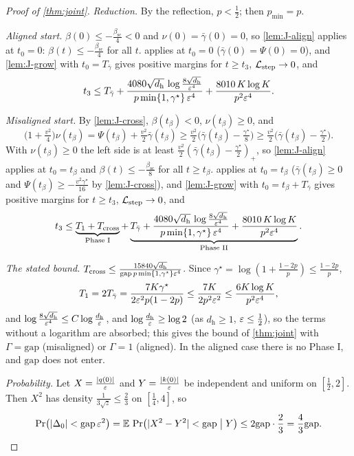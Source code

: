 \begin{proof}[Proof of \cref{thm:joint}]
\emph{Reduction.} By the reflection, $p<\frac{1}{2}$; then $p_{\min}=p$.

\emph{Aligned start.} $\beta(0)\le-\frac{\beta_{\mathrm{sc}}}{4}<0$ and $\nu(0)=\bar\gamma(0)=0$, so \cref{lem:J-align} applies at $t_0=0$: $\beta(t)\le-\frac{\beta_{\mathrm{sc}}}{4}$ for all $t$.
 applies at $t_0=0$ ($\bar\gamma(0)=\Psi(0)=0$), and
\cref{lem:J-grow} with $t_0=T_{\bar\gamma}$ gives positive margins for $t\ge t_3$, $\mathcal L_{\mathrm{step}}\to0$, and
\[
 t_3\le T_{\bar\gamma}+\frac{4080\sqrt{d_{\mathrm h}}\,\log\frac{8\sqrt{d_{\mathrm h}}}{\varepsilon^4}}{p\min\{1,\gamma^\star\}\,\varepsilon^4}+\frac{8010\,K\log K}{p^2\varepsilon^4} .
\]

\emph{Misaligned start.} By \cref{lem:J-cross}, $\beta(t_\beta)<0$, $\nu(t_\beta)\ge0$, and
\[
 \bigl(1+\tfrac{v^2}{4}\bigr)\nu(t_\beta)=\Psi(t_\beta)+\tfrac{v^2}{2}\bar\gamma(t_\beta)\ge\tfrac{v^2}{2}\bigl(\bar\gamma(t_\beta)-\tfrac{\gamma^\star}{8}\bigr)\ge\tfrac{v^2}{2}\bigl(\bar\gamma(t_\beta)-\tfrac{\gamma^\star}{2}\bigr).
\]
With $\nu(t_\beta)\ge0$ the left side is at least $\frac{v^2}{2}(\bar\gamma(t_\beta)-\frac{\gamma^\star}{2})_+$, so \cref{lem:J-align} applies at $t_0=t_\beta$ and $\beta(t)\le-\frac{\beta_{\mathrm{sc}}}{8}$ for all $t\ge t_\beta$. 
applies at $t_0=t_\beta$ ($\bar\gamma(t_\beta)\ge0$ and $\Psi(t_\beta)\ge-\frac{v^2\gamma^\star}{16}$ by \cref{lem:J-cross}), and \cref{lem:J-grow} with $t_0=t_\beta+T_{\bar\gamma}$ gives positive margins for $t\ge t_3$, $\mathcal L_{\mathrm{step}}\to0$, and
\[
 t_3\le\underbrace{T_1+T_{\mathrm{cross}}}_{\text{Phase I}}+\underbrace{T_{\bar\gamma}+\frac{4080\sqrt{d_{\mathrm h}}\,\log\frac{8\sqrt{d_{\mathrm h}}}{\varepsilon^4}}{p\min\{1,\gamma^\star\}\,\varepsilon^4}+\frac{8010\,K\log K}{p^2\varepsilon^4}}_{\text{Phase II}} .
\]

\emph{The stated bound.} $T_{\mathrm{cross}}\le\frac{15840\sqrt{d_{\mathrm h}}}{\mathrm{gap}\,p\min\{1,\gamma^\star\}\varepsilon^4}$. Since $\gamma^\star=\log(1+\frac{1-2p}{p})\le\frac{1-2p}{p}$,
\[
 T_1=2T_{\bar\gamma}=\frac{7K\gamma^\star}{2\varepsilon^2p(1-2p)}\le\frac{7K}{2p^2\varepsilon^2}\le\frac{6K\log K}{p^2\varepsilon^4},
\]
and $\log\frac{8\sqrt{d_{\mathrm h}}}{\varepsilon^4}\le C\log\frac{d_{\mathrm h}}{\varepsilon}$, and $\log\frac{d_{\mathrm h}}{\varepsilon}\ge\log2$ (as $d_{\mathrm h}\ge1$, $\varepsilon\le\frac12$), so the terms without a logarithm are absorbed; this gives the bound of \cref{thm:joint} with $\Gamma=\mathrm{gap}$ (misaligned) or $\Gamma=1$ (aligned). In the
aligned case there is no Phase I, and $\mathrm{gap}$ does not enter.

\emph{Probability.} Let $X=\frac{|q(0)|}{\varepsilon}$ and $Y=\frac{|k(0)|}{\varepsilon}$ be independent and uniform on $[\frac{1}{2},2]$. Then $X^2$ has density
$\frac{1}{3\sqrt z}\le\frac{2}{3}$ on $[\frac{1}{4},4]$, so
\[
 \Pr\bigl(|\Delta_0|<\mathrm{gap}\,\initscale^2\bigr)=\E\,\Pr\bigl(|X^2-Y^2|<\mathrm{gap}\bigm|Y\bigr)\le2\mathrm{gap}\cdot\tfrac{2}{3}=\tfrac{4}{3}\mathrm{gap} .\qedhere
\]
\end{proof}

